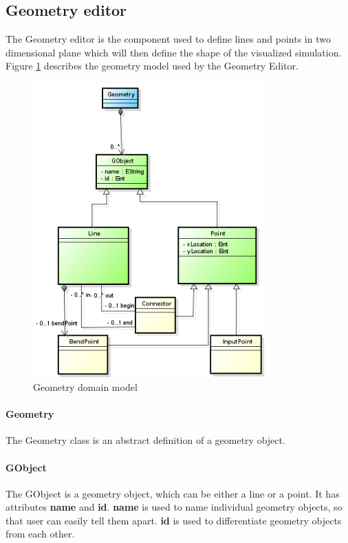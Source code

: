 \subsection{Geometry editor}

The Geometry editor is the component used to define lines and points in two dimensional plane which will then define the shape of the visualized simulation. Figure \ref{fig:model-geometry} describes the geometry model used by the Geometry Editor.

\begin{figure}[htp]
\begin{center}
  \includegraphics[width=0.8\textwidth]{image/model-geometry.png}
  \caption{Geometry domain model}
  \label{fig:model-geometry}
\end{center}
\end{figure}

\paragraph{Geometry}
The Geometry class is an abstract definition of a geometry object.

\paragraph{GObject}
The GObject is a geometry object, which can be either a line or a point. It has attributes \textbf{name} and \textbf{id}. \textbf{name} is used to name individual geometry objects, so that user can easily tell them apart. \textbf{id} is used to differentiate geometry objects from each other.

